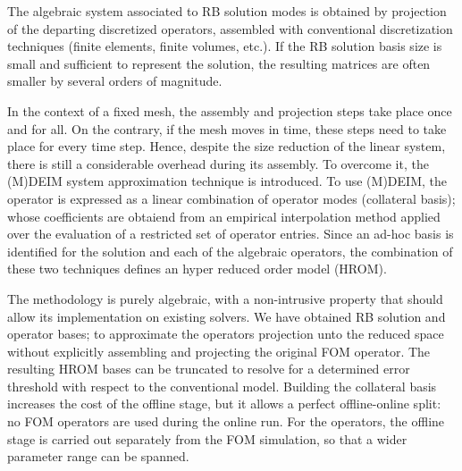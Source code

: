 
The algebraic system associated to RB solution modes is 
obtained by projection of the departing discretized operators,
assembled with conventional discretization techniques 
(finite elements, finite volumes, etc.).
If the RB solution basis size is small and sufficient to represent the solution,
the resulting matrices are often smaller by several orders of magnitude.

In the context of a fixed mesh, 
the assembly and projection steps take place once and for all.
On the contrary, if the mesh moves in time,
these steps need to take place for every time step.
Hence, despite the size reduction of the linear system,
there is still a considerable overhead during its assembly.
To overcome it, the (M)DEIM system approximation technique is introduced.
To use (M)DEIM, the operator is expressed as a linear combination of operator modes (collateral basis);
whose coefficients are obtaiend from an empirical interpolation method applied over
the evaluation of a restricted set of operator entries.
Since an ad-hoc basis is identified for the solution and each of the algebraic operators,
the combination of these two techniques defines an hyper reduced order model (HROM).

The methodology is purely algebraic, 
with a non-intrusive property that should allow its implementation on existing solvers.
We have obtained RB solution and operator bases;
to approximate the operators projection unto the reduced space 
without explicitly assembling and projecting the original FOM operator.
The resulting HROM bases can be truncated
to resolve for a determined error threshold with respect to the conventional model.
Building the collateral basis increases the cost of the offline stage,
but it allows a perfect offline-online split:
no FOM operators are used during the online run. 
For the operators, the offline stage is carried out separately from the FOM simulation,
so that a wider parameter range can be spanned. 

